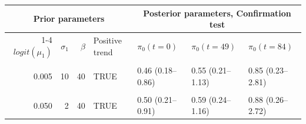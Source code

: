 \centering
\begin{tabular}{r|r|r|l|l|l|l}
\hline
\multicolumn{4}{c|}{Prior parameters} & \multicolumn{3}{c}{Posterior parameters, Confirmation test} \\
\cline{1-4} \cline{5-7}
$logit(\mu_1)$ & $\sigma_1$ & $\beta$ & Positive trend & $\pi_0(t=0)$ & $\pi_0(t=49)$  & $\pi_0(t=84)$\\
\hline
\cellcolor{gray!6}{0.005} & \cellcolor{gray!6}{10} & \cellcolor{gray!6}{40} & \cellcolor{gray!6}{FALSE} & \cellcolor{gray!6}{0.48 (0.19–0.90)} & \cellcolor{gray!6}{0.48 (0.19–0.91)} & \cellcolor{gray!6}{0.48 (0.18–0.95)}\\
\hline
0.005 & 10 & 40 & TRUE & 0.46 (0.18–0.86) & 0.55 (0.21–1.13) & 0.85 (0.23–2.81)\\
\hline
\cellcolor{gray!6}{0.050} & \cellcolor{gray!6}{2} & \cellcolor{gray!6}{40} & \cellcolor{gray!6}{FALSE} & \cellcolor{gray!6}{0.52 (0.21–0.95)} & \cellcolor{gray!6}{0.52 (0.21–0.96)} & \cellcolor{gray!6}{0.52 (0.20–1.02)}\\
\hline
0.050 & 2 & 40 & TRUE & 0.50 (0.21–0.91) & 0.59 (0.24–1.16) & 0.88 (0.26–2.72)\\
\hline
\end{tabular}